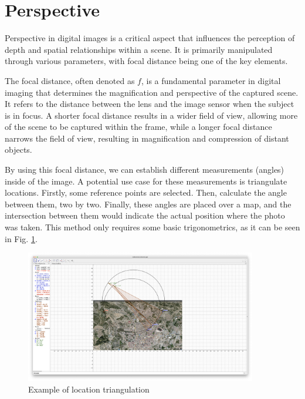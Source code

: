 \section{Perspective}

Perspective in digital images is a critical aspect that influences the perception of depth and spatial relationships within a scene. It is primarily manipulated through various parameters, with focal distance being one of the key elements.

The focal distance, often denoted as $f$, is a fundamental parameter in digital imaging that determines the magnification and perspective of the captured scene. It refers to the distance between the lens and the image sensor when the subject is in focus. A shorter focal distance results in a wider field of view, allowing more of the scene to be captured within the frame, while a longer focal distance narrows the field of view, resulting in magnification and compression of distant objects.

By using this focal distance, we can establish different measurements (angles) inside of the image. A potential use case for these measurements is triangulate locations. Firstly, some reference points are selected. Then, calculate the angle between them, two by two. Finally, these angles are placed over a map, and the intersection between them would indicate the actual position where the photo was taken. This method only requires some basic trigonometrics, as it can be seen in Fig. \ref{fig:triangulation}.

\begin{figure}[H]
    \centering
    \includegraphics[width=0.9\textwidth]{img/Inter-Circs.png}
    \caption{Example of location triangulation}
    \label{fig:triangulation}
\end{figure}

